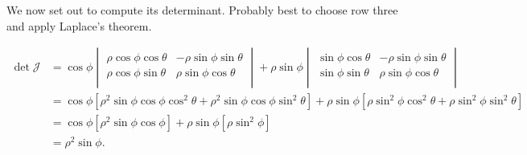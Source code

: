 \documentclass{article}
\begin{document}
We now set out to compute its determinant. Probably best to choose row three and apply Laplace's theorem.

\begin{align*}
\det \mathcal{J} &= \cos \phi \begin{vmatrix}
\rho \cos \phi \cos \theta & -\rho \sin \phi \sin \theta\\
\rho \cos \phi \sin \theta & \rho \sin \phi \cos \theta\\
\end{vmatrix}
+
\rho \sin \phi \begin{vmatrix}
\sin \phi \cos \theta & -\rho \sin \phi \sin \theta\\
\sin \phi \sin \theta & \rho \sin \phi \cos \theta\\
\end{vmatrix}\\
&= \cos \phi [\rho^{2} \sin\phi\cos\phi \cos^{2}\theta + \rho^{2} \sin\phi\cos\phi\sin^{2}\theta] + \rho\sin\phi [\rho\sin^{2}\phi\cos^{2}\theta + \rho\sin^{2}\phi\sin^{2}\theta]\\
&= \cos\phi[\rho^{2}\sin\phi\cos\phi] + \rho\sin\phi[\rho\sin^{2}\phi]\\
&= \rho^{2}\sin\phi.
\end{align*}
\end{document}
